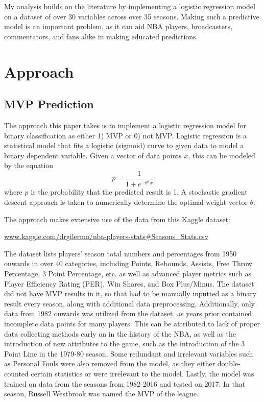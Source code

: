 \documentclass{article}
\begin{document}
My analysis builds on the literature by implementing a logistic regression model on a dataset of over 30 variables across over 35 seasons. Making such a predictive model is an important problem, as it can aid NBA players, broadcasters, commentators, and fans alike in making educated predictions.

\section{\Large Approach}
\label{gen_inst}
\subsection{MVP Prediction}

The approach this paper takes is to implement a logistic regression model for binary classification as either 1) MVP or 0) not MVP. Logistic regression is a statistical model that fits a logistic (sigmoid) curve to given data to model a binary dependent variable. Given a vector of data points $x$, this can be modeled by the equation $$p = \frac{1}{1 + e^{-\theta^T x}}$$ where $p$ is the probability that the predicted result is 1. A stochastic gradient descent approach is taken to numerically determine the optimal weight vector $\theta$.

The approach makes extensive use of the data from this Kaggle dataset:
\begin{center}
	\url{www.kaggle.com/drgilermo/nba-players-stats#Seasons_Stats.csv}
\end{center}

The dataset lists players' season total numbers and percentages from 1950 onwards in over 40 categories, including Points, Rebounds, Assists, Free Throw Percentage, 3 Point Percentage, etc. as well as advanced player metrics such as Player Efficiency Rating (PER), Win Shares, and Box Plus/Minus. The dataset did not have MVP results in it, so that had to be manually inputted as a binary result every season, along with additional data preprocessing. Additionally, only data from 1982 onwards was utilized from the dataset, as years prior contained incomplete data points for many players. This can be attributed to lack of proper data collecting methods early on in the history of the NBA, as well as the introduction of new attributes to the game, such as the introduction of the 3 Point Line in the 1979-80 season. Some redundant and irrelevant variables such as Personal Fouls were also removed from the model, as they either double-counted certain statistics or were irrelevant to the model. Lastly, the model was trained on data from the seasons from 1982-2016 and tested on 2017. In that season, Russell Westbrook was named the MVP of the league.
\end{document}
